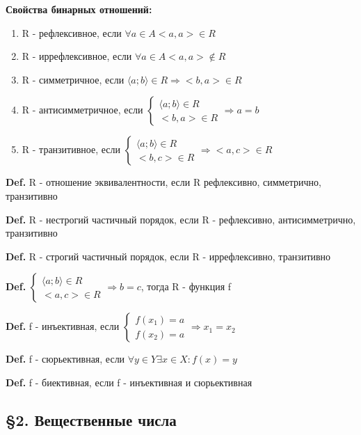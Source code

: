 \documentclass[14pt, letter paper]{article}
\newcommand{\q}[1]{\langle #1 \rangle}
\begin{document}
\textbf{Свойства бинарных отношений: }
\begin{enumerate}
    \item R - рефлексивное, если $\forall a \in A <a, a> \in R$
    \item R - иррефлексивное, если $\forall a \in A <a, a> \notin R$
    \item R - симметричное, если $\q{a; b} \in R \Rightarrow <b, a> \in R$
    \item R - антисимметричное, если $\begin{cases} \q{a; b} \in R \\ <b, a> \in R \end{cases} \Rightarrow a = b$
    \item R - транзитивное, если $\begin{cases} \q{a; b} \in R \\ <b, c> \in R \end{cases} \Rightarrow <a, c> \in R$
\end{enumerate}

\textbf{Def.} R - отношение эквивалентности, если R рефлексивно, симметрично, транзитивно

\textbf{Def.} R - нестрогий частичный порядок, если R - рефлексивно, антисимметрично, транзитивно

\textbf{Def.} R - строгий частичный порядок, если R - иррефлексивно, транзитивно

\textbf{Def.} $\begin{cases} \q{a; b} \in R \\ <a, c> \in R \end{cases} \Rightarrow b = c$, тогда R - функция f

\textbf{Def.} f - инъективная, если $\begin{cases} f(x_1) = a \\ f(x_2) = a \end{cases} \Rightarrow x_1 = x_2$

\textbf{Def.} f - сюрьективная, если $\forall y \in Y \exists x \in X : f(x) = y$

\textbf{Def.} f - биективная, если f - инъективная и сюрьективная

\begin{center} \subsection*{\S 2. Вещественные числа} \end{center}
\end{document}
